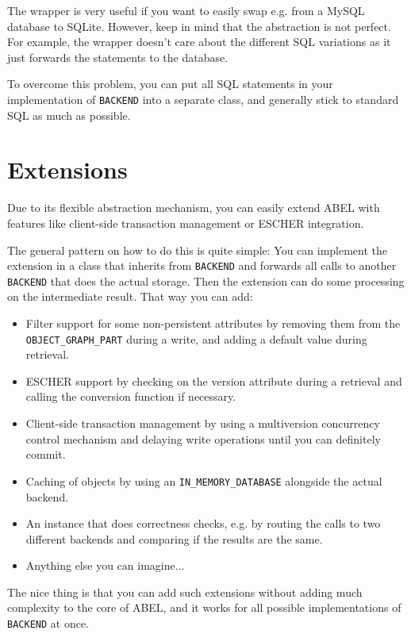 \documentclass[a4paper,12pt]{report}
\begin{document}
The wrapper is very useful if you want to easily swap e.g. from a MySQL database to SQLite.
However, keep in mind that the abstraction is not perfect. 
For example, the wrapper doesn't care about the different SQL variations as it just forwards the statements to the database.

To overcome this problem, you can put all SQL statements in your implementation of \lstinline!BACKEND! into a separate class, and generally stick to standard SQL as much as possible.


\chapter{Extensions}

Due to its flexible abstraction mechanism, you can easily extend ABEL with features like client-side transaction management or ESCHER \cite {PiccioniOriolMeyer12} integration.

The general pattern on how to do this is quite simple: 
You can implement the extension in a class that inherits from \lstinline!BACKEND! and forwards all calls to another \lstinline!BACKEND! that does the actual storage.
Then the extension can do some processing on the intermediate result.
That way you can add:

\begin{itemize}
 \item Filter support for some non-persistent attributes by removing them from the \lstinline!OBJECT_GRAPH_PART! during a write, and adding a default value during retrieval.
 \item ESCHER support by checking on the version attribute during a retrieval and calling the conversion function if necessary.
 \item Client-side transaction management by using a multiversion concurrency control mechanism and delaying write operations until you can definitely commit.
 \item Caching of objects by using an \lstinline!IN_MEMORY_DATABASE! alongside the actual backend.
 \item An instance that does correctness checks, e.g. by routing the calls to two different backends and comparing if the results are the same.
 \item Anything else you can imagine...
\end{itemize}

The nice thing is that you can add such extensions without adding much complexity to the core of ABEL, and it works for all possible implementations of \lstinline!BACKEND! at once.
\end{document}
